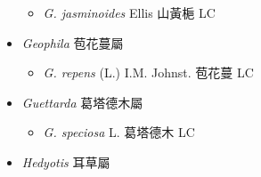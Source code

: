 \begin{itemize}
  \begin{itemize}
        \item[] \textit{G. jasminoides} Ellis  山黃梔   LC
  \end{itemize}
 \item[] \textit{Geophila} 苞花蔓屬
                                
  \begin{itemize}
        \item[] \textit{G. repens} (L.) I.M. Johnst.  苞花蔓   LC
  \end{itemize}
 \item[] \textit{Guettarda} 葛塔德木屬
                                
  \begin{itemize}
        \item[] \textit{G. speciosa} L.  葛塔德木   LC
  \end{itemize}
 \item[] \textit{Hedyotis} 耳草屬
                                

\end{itemize}

